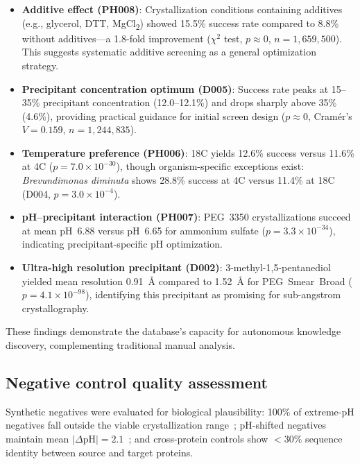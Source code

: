 \documentclass[11pt]{article}
\begin{document}
\begin{itemize}
  \item \textbf{Additive effect (PH008)}: Crystallization conditions containing additives (e.g., glycerol, DTT, MgCl\textsubscript{2}) showed 15.5\% success rate compared to 8.8\% without additives---a 1.8-fold improvement ($\chi^2$ test, $p \approx 0$, $n = 1{,}659{,}500$). This suggests systematic additive screening as a general optimization strategy.
  \item \textbf{Precipitant concentration optimum (D005)}: Success rate peaks at 15--35\% precipitant concentration (12.0--12.1\%) and drops sharply above 35\% (4.6\%), providing practical guidance for initial screen design ($p \approx 0$, Cram\'{e}r's $V = 0.159$, $n = 1{,}244{,}835$).
  \item \textbf{Temperature preference (PH006)}: 18\textdegree C yields 12.6\% success versus 11.6\% at 4\textdegree C ($p = 7.0 \times 10^{-30}$), though organism-specific exceptions exist: \textit{Brevundimonas diminuta} shows 28.8\% success at 4\textdegree C versus 11.4\% at 18\textdegree C (D004, $p = 3.0 \times 10^{-4}$).
  \item \textbf{pH--precipitant interaction (PH007)}: PEG~3350 crystallizations succeed at mean pH~6.88 versus pH~6.65 for ammonium sulfate ($p = 3.3 \times 10^{-34}$), indicating precipitant-specific pH optimization.
  \item \textbf{Ultra-high resolution precipitant (D002)}: 3-methyl-1,5-pentanediol yielded mean resolution 0.91~\AA{} compared to 1.52~\AA{} for PEG~Smear~Broad ($p = 4.1 \times 10^{-98}$), identifying this precipitant as promising for sub-angstrom crystallography.
\end{itemize}

These findings demonstrate the database's capacity for autonomous knowledge discovery, complementing traditional manual analysis.

\subsection*{Negative control quality assessment}

Synthetic negatives were evaluated for biological plausibility: 100\% of extreme-pH negatives fall outside the viable crystallization range~\cite{jancarik1991}; pH-shifted negatives maintain mean $|\Delta\text{pH}| = 2.1$~\cite{luft2003}; and cross-protein controls show $<30\%$ sequence identity between source and target proteins.
\end{document}
